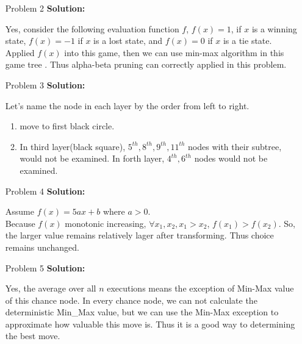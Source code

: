 \normalfont\documentclass[letterpaper,11pt]{article}
\begin{document}
\begin{enumerate}
\item[Problem 2]\textbf{Solution:}\par
	Yes, consider the following evaluation function $f$, $f(x) = 1$, if $x$ is a winning state, $f(x) = -1$ if $x$ is a lost state, and $f(x) = 0$ if $x$ is a tie state. Applied $f(x)$ into this game, then we can use min-max algorithm in this game tree . Thus alpha-beta pruning can correctly applied in this problem.
\item [Problem 3]\textbf{Solution:}\par
	Let's name the node in each layer by the order from left to right.
	\begin{enumerate}		
		\item move to first black circle.
		\item In third layer(black square), $5^{th}, 8^{th},9^{th}, 11^{th}$ nodes with their subtree, would not be examined. In forth layer, $4^{th}, 6^{th}$ nodes would not be examined.
	\end{enumerate}	
\item[Problem 4]\textbf{Solution:}\par
	Assume $f(x) = 5ax + b$ where $a > 0$.\\
	Because $f(x)$ monotonic increasing, $\forall x_1,x_2, x_1 > x_2$, $f(x_1)> f(x_2)$. So, the larger value remains relatively lager after transforming. Thus choice remains unchanged.
\item [Problem 5]\textbf{Solution:}\par
	Yes, the average over all $n$ executions means the exception of Min-Max value of this chance node. In every chance node, we can not calculate the deterministic Min_Max value, but we can use the Min-Max exception to approximate how valuable this move is. Thus it is a good way to determining the best move.

\end{enumerate}
\end{document}
